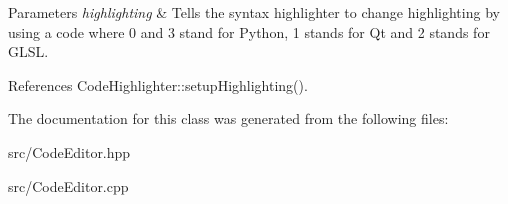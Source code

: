 \begin{DoxyParams}{Parameters}
{\em highlighting} & Tells the syntax highlighter to change highlighting by using a code where 0 and 3 stand for Python, 1 stands for Qt and 2 stands for G\+L\+S\+L. \\
\hline
\end{DoxyParams}


References Code\+Highlighter\+::setup\+Highlighting().



The documentation for this class was generated from the following files\+:\begin{DoxyCompactItemize}
\item 
src/Code\+Editor.\+hpp\item 
src/Code\+Editor.\+cpp\end{DoxyCompactItemize}
